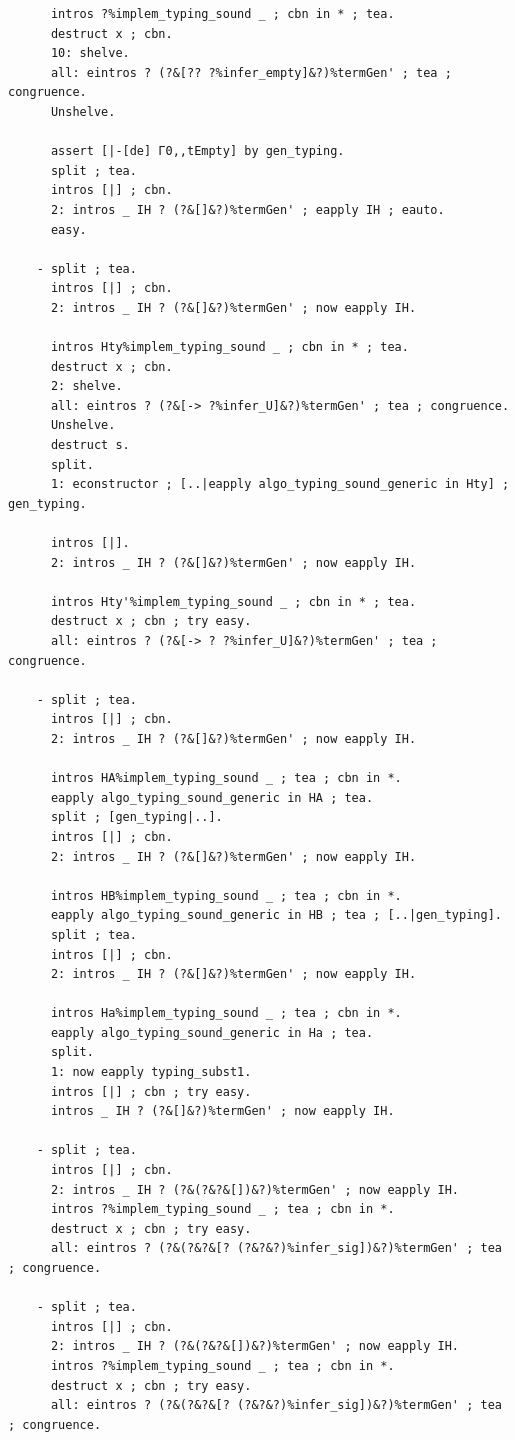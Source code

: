 \begin{lstlisting}
      intros ?%implem_typing_sound _ ; cbn in * ; tea.
      destruct x ; cbn.
      10: shelve.
      all: eintros ? (?&[?? ?%infer_empty]&?)%termGen' ; tea ; congruence.
      Unshelve.

      assert [|-[de] Γ0,,tEmpty] by gen_typing.
      split ; tea.
      intros [|] ; cbn.
      2: intros _ IH ? (?&[]&?)%termGen' ; eapply IH ; eauto.
      easy.
    
    - split ; tea.
      intros [|] ; cbn.
      2: intros _ IH ? (?&[]&?)%termGen' ; now eapply IH.
      
      intros Hty%implem_typing_sound _ ; cbn in * ; tea.
      destruct x ; cbn.
      2: shelve.
      all: eintros ? (?&[-> ?%infer_U]&?)%termGen' ; tea ; congruence.
      Unshelve.
      destruct s.
      split.
      1: econstructor ; [..|eapply algo_typing_sound_generic in Hty] ; gen_typing.

      intros [|].
      2: intros _ IH ? (?&[]&?)%termGen' ; now eapply IH.

      intros Hty'%implem_typing_sound _ ; cbn in * ; tea.
      destruct x ; cbn ; try easy.
      all: eintros ? (?&[-> ? ?%infer_U]&?)%termGen' ; tea ; congruence.

    - split ; tea.
      intros [|] ; cbn.
      2: intros _ IH ? (?&[]&?)%termGen' ; now eapply IH.

      intros HA%implem_typing_sound _ ; tea ; cbn in *.
      eapply algo_typing_sound_generic in HA ; tea.
      split ; [gen_typing|..].
      intros [|] ; cbn.
      2: intros _ IH ? (?&[]&?)%termGen' ; now eapply IH.

      intros HB%implem_typing_sound _ ; tea ; cbn in *.
      eapply algo_typing_sound_generic in HB ; tea ; [..|gen_typing].
      split ; tea.
      intros [|] ; cbn.
      2: intros _ IH ? (?&[]&?)%termGen' ; now eapply IH.

      intros Ha%implem_typing_sound _ ; tea ; cbn in *.
      eapply algo_typing_sound_generic in Ha ; tea.
      split.
      1: now eapply typing_subst1.
      intros [|] ; cbn ; try easy.
      intros _ IH ? (?&[]&?)%termGen' ; now eapply IH.

    - split ; tea.
      intros [|] ; cbn.
      2: intros _ IH ? (?&(?&?&[])&?)%termGen' ; now eapply IH.
      intros ?%implem_typing_sound _ ; tea ; cbn in *.
      destruct x ; cbn ; try easy.
      all: eintros ? (?&(?&?&[? (?&?&?)%infer_sig])&?)%termGen' ; tea ; congruence.

    - split ; tea.
      intros [|] ; cbn.
      2: intros _ IH ? (?&(?&?&[])&?)%termGen' ; now eapply IH.
      intros ?%implem_typing_sound _ ; tea ; cbn in *.
      destruct x ; cbn ; try easy.
      all: eintros ? (?&(?&?&[? (?&?&?)%infer_sig])&?)%termGen' ; tea ; congruence.


\end{lstlisting}
